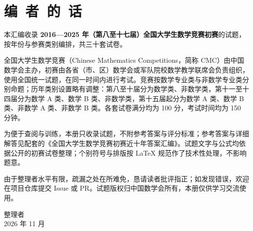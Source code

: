 \chapter*{编\ 者\ 的\ 话}

本汇编收录 \textbf{2016—2025 年（第八至十七届）全国大学生数学竞赛初赛}的试题，按年份与参赛类别编排，共三十套试卷。

全国大学生数学竞赛（Chinese Mathematics Competitions，简称 CMC）由中国数学会主办，初赛由各省（市、区）数学会或军队院校数学教学联席会负责组织，使用全国统一试题，在同一时间内进行考试。竞赛按数学专业类与非数学专业类分别命题；历年类别设置略有调整：第八至十届分为数学类、非数学类，第十一至十四届分为数学 A 类、数学 B 类、非数学类，第十五届起分为数学 A 类、数学 B 类、非数学 A 类、非数学 B 类。各套试卷满分均为 100 分，考试时间均为 150 分钟。

为便于查阅与训练，本册只收录试题，不附参考答案与评分标准；参考答案与详细解答见配套的《全国大学生数学竞赛初赛近十年答案汇编》。试题文字与公式均依据公开的初赛试卷整理；个别符号与排版按 \LaTeX{} 规范作了技术性处理，不影响题意。

由于整理者水平有限，疏漏之处在所难免，恳请读者批评指正；如发现错误，欢迎在项目仓库提交 Issue 或 PR。试题版权归中国数学会所有，本册仅供学习交流使用。

\vspace{2em}
\begin{flushright}
  整理者\\
  2026 年 11 月
\end{flushright}
